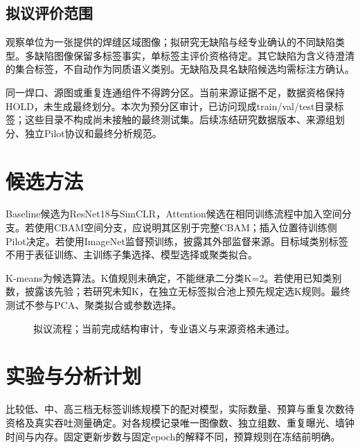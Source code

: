 \documentclass[11pt,a4paper]{article}
\begin{document}
\subsection{拟议评价范围}
观察单位为一张提供的焊缝区域图像；拟研究无缺陷与经专业确认的不同缺陷类型。多缺陷图像保留多标签事实，单标签主评价资格待定。其它缺陷为含义待澄清的集合标签，不自动作为同质语义类别。无缺陷及具名缺陷候选均需标注方确认。

同一焊口、源图或重复连通组件不得跨分区。当前来源证据不足，数据资格保持HOLD，未生成最终划分。本次为预分区审计，已访问现成train/val/test目录标签；这些目录不构成尚未接触的最终测试集。后续冻结研究数据版本、来源组划分、独立Pilot协议和最终分析规范。

\section{候选方法}
Baseline候选为ResNet18与SimCLR\cite{he2016resnet,chen2020simclr}，Attention候选在相同训练流程中加入空间分支。若使用CBAM空间分支\cite{woo2018cbam}，应说明其区别于完整CBAM；插入位置待训练侧Pilot决定。若使用ImageNet监督预训练，披露其外部监督来源。目标域类别标签不用于表征训练、主训练子集选择、模型选择或聚类拟合。

K-means为候选算法。K值规则未确定，不能继承二分类K=2。若使用已知类别数，披露该先验；若研究未知K，在独立无标签拟合池上预先规定选K规则。最终测试不参与PCA、聚类拟合或参数选择。

\begin{figure}[ht]\centering
{}
\caption{拟议流程；当前完成结构审计，专业语义与来源资格未通过。}
\end{figure}

\section{实验与分析计划}
比较低、中、高三档无标签训练规模下的配对模型，实际数量、预算与重复次数待资格及真实吞吐测量确定。对各规模记录唯一图像数、独立组数、重复曝光、墙钟时间与内存。固定更新步数与固定epoch的解释不同，预算规则在冻结前明确。
\end{document}
